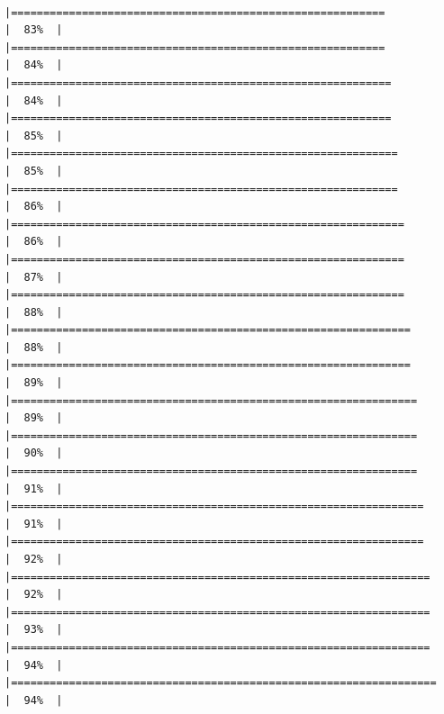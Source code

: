 \documentclass[
  ignorenonframetext,
]{beamer}
\begin{document}
\begin{frame}[fragile]{}
\begin{verbatim}
                                                                        |==========================================================            |  83%  |                                                                              |==========================================================            |  84%  |                                                                              |===========================================================           |  84%  |                                                                              |===========================================================           |  85%  |                                                                              |============================================================          |  85%  |                                                                              |============================================================          |  86%  |                                                                              |=============================================================         |  86%  |                                                                              |=============================================================         |  87%  |                                                                              |=============================================================         |  88%  |                                                                              |==============================================================        |  88%  |                                                                              |==============================================================        |  89%  |                                                                              |===============================================================       |  89%  |                                                                              |===============================================================       |  90%  |                                                                              |===============================================================       |  91%  |                                                                              |================================================================      |  91%  |                                                                              |================================================================      |  92%  |                                                                              |=================================================================     |  92%  |                                                                              |=================================================================     |  93%  |                                                                              |=================================================================     |  94%  |                                                                              |==================================================================    |  94%  |                                                                              
\end{verbatim}
\end{frame}
\end{document}
